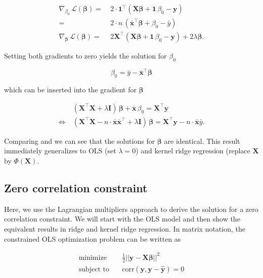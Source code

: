 \documentclass[utf8]{frontiersSCNS} %
\renewcommand{\b}{\boldsymbol{\beta}} %
\newcommand{\corr}{\text{corr}}
\newcommand{\I}{\mathbf{I}}
\renewcommand{\L}{\mathcal{L}}
\newcommand{\mx}{\mathbf{\bar{x}}}
\newcommand{\my}{\bar{y}}
\newcommand{\one}{\mathbf{1}}
\newcommand{\X}{\mathbf{X}}
\newcommand{\y}{\mathbf{y}}
\newcommand{\yh}{\mathbf{\hat{y}}}
\begin{document}
\begin{equation*}
\begin{split}
\nabla_{\beta_0}\, \L(\b) =&\ 2\cdot\one^\top(\X\b+\one\,\beta_0 - \y)\\
=&\ 2\cdot n\,(\mx^\top\b+\beta_0 - \my)\\
\nabla_{\b}\, \L(\b) =&\ 2\X^\top(\X\b+\one\,\beta_0-\y) + 2\lambda\b.
\end{split}
\end{equation*}

Setting both gradients to zero yields the solution for $\beta_0$

\[
\beta_0 = \my - \mx^\top\b
\]

which can be inserted into the gradient for $\b$

\begin{equation}\label{eq:equal_coefficients2}
\begin{split}
& (\X^\top\X + \lambda\I)\,\b + \mx\,\beta_0 = \X^\top\y\\
\Longleftrightarrow\ & (\X^\top\X - n\cdot\mx\mx^\top + \lambda\I)\,\b = \X^\top\y - n\cdot\mx\my.
\end{split}
\end{equation}

Comparing  and  we can see that the solutions for $\b$ are identical. This result immediately generalizes to OLS (set $\lambda=0$) and kernel ridge regression (replace $\X$ by $\Phi(\X)$. 


\subsection{Zero correlation constraint}\label{app:solution_zero_correlation}

Here, we use the Lagrangian multipliers approach to derive the solution for a zero correlation constraint. We will start with the OLS model and then show the equivalent results in ridge and kernel ridge regression. In matrix notation, the constrained OLS optimization problem can be written as 

\begin{equation*}
\begin{split}
    \text{minimize}\quad& \frac{1}{2}|| \y - \X\b||^2\\
    \text{subject to}\quad&  \corr(\y,\y-\yh) = 0
\end{split}
\end{equation*}
\end{document}

